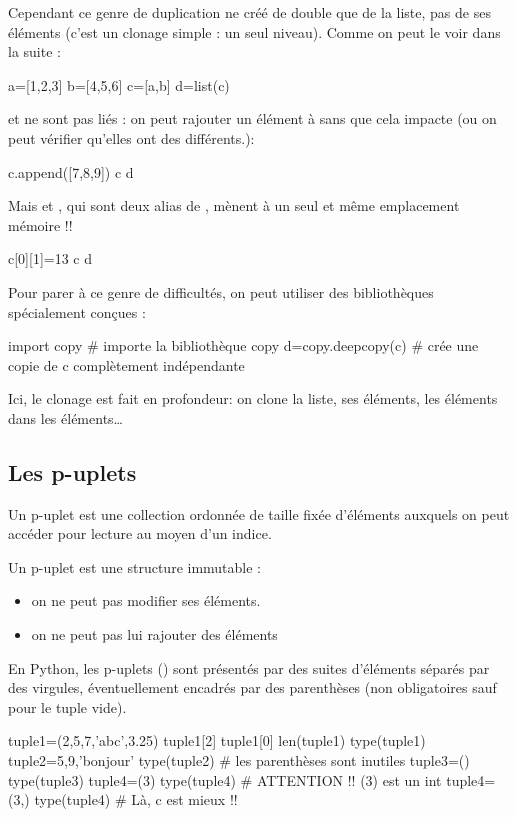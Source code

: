 \documentclass[11pt,a4paper,french,twoside]{PMCours}
\begin{document}
Cependant ce genre de duplication ne créé de double que de la liste, pas de ses 
éléments (c'est un clonage simple : un seul niveau). Comme on peut le voir dans
la suite :
\begin{Python}
a=[1,2,3]
b=[4,5,6] 
c=[a,b] 
d=list(c) 
\end{Python}
 et  ne sont pas liés : on peut rajouter un élément à  
sans que cela impacte  (ou on peut vérifier qu'elles ont des  
différents.): 
\begin{Python}
c.append([7,8,9]) 
c
d
\end{Python}
Mais  et , qui sont deux alias de , mènent à un 
seul et même emplacement mémoire !! 
\begin{Python}
c[0][1]=13 
c 
d 
\end{Python}
Pour parer à ce genre de difficultés, on peut utiliser des bibliothèques 
spécialement conçues : 
\begin{Python}
import copy  # importe la bibliothèque copy
d=copy.deepcopy(c) # crée une copie de c complètement indépendante 
\end{Python}
Ici, le clonage est fait en profondeur: on clone la liste, ses éléments, les 
éléments dans les éléments\dots
\subsection{Les p-uplets}
\begin{Definition}{}
Un p-uplet est une collection ordonnée de taille fixée d'éléments auxquels on 
peut accéder pour lecture au moyen d'un indice.

Un p-uplet est une structure immutable :
	\begin{itemize}
	\item on ne peut pas modifier ses éléments.
	\item on ne peut pas lui rajouter des éléments
	\end{itemize}
\end{Definition}

\medskip
En Python, les p-uplets () sont présentés par des suites d'éléments
séparés par des virgules, éventuellement encadrés par des parenthèses (non 
obligatoires sauf pour le tuple vide).

\medskip
\begin{Python}
tuple1=(2,5,7,'abc',3.25)
tuple1[2]
tuple1[0]
len(tuple1)
type(tuple1)
tuple2=5,9,'bonjour'
type(tuple2) # les parenthèses sont inutiles
tuple3=()
type(tuple3)
tuple4=(3)
type(tuple4) # ATTENTION !! (3) est un int
tuple4=(3,)
type(tuple4) # Là, c est mieux !!
\end{Python}
\end{document}
